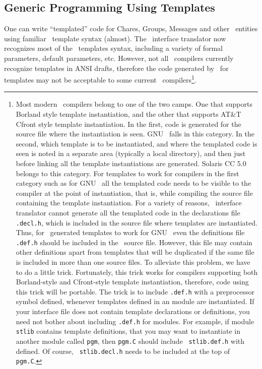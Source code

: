 \subsection{Generic Programming Using Templates}

One can write ``templated'' code for Chares, Groups, Messages and other
\charmpp\  entities using familiar \CC\ template syntax (almost). The \charmpp\
interface translator now recognizes most of the \CC\ templates syntax,
including a variety of formal parameters, default parameters, etc. However, not
all \CC\ compilers currently recognize templates in ANSI drafts, therefore the
code generated by \charmpp\ for templates may not be acceptable to some current
\CC\ compilers\footnote{ Most modern \CC\ compilers belong to one of the two
camps. One that supports Borland style template instantiation, and the other
that supports AT\&T Cfront style template instantiation. In the first, code is
generated for the source file where the instantiation is seen.  GNU \CC\ falls
in this category.  In the second, which template is to be instantiated, and
where the templated code is seen is noted in a separate area (typically a local
directory), and then just before linking all the template instantiations are
generated. Solaris CC 5.0 belongs to this category. For templates to work for
compilers in the first category such as for GNU \CC\ all the templated code
needs to be visible to the compiler at the point of instantiation, that is,
while compiling the source file containing the template instantiation. For a
variety of reasons, \charmpp\ interface translator cannot generate all the
templated code in the declarations file {\tt *.decl.h}, which is included in
the source file where templates are instantiated. Thus, for \charmpp\ generated
templates to work for GNU \CC\ even the definitions file {\tt *.def.h} should
be included in the \CC\ source file. However, this file may contain other
definitions apart from templates that will be duplicated if the same file is
included in more than one source files. To alleviate this problem, we have to
do a little trick. Fortunately, this trick works for compilers supporting both
Borland-style and Cfront-style template instantiation, therefore, code using
this trick will be portable. The trick is to include {\tt *.def.h} with a
preprocessor symbol \kw{CK\_TEMPLATES\_ONLY} defined, whenever templates
defined in an \kw{extern} module are instantiated. If your interface file does
not contain template declarations or definitions, you need not bother about
including {\tt *.def.h} for \kw{extern} modules.  For example, if module {\tt
stlib} contains template definitions, that you may want to instantiate in
another module called {\tt pgm}, then {\tt pgm.C} should include {\tt
stlib.def.h} with \kw{CK\_TEMPLATES\_ONLY} defined. Of course, {\tt
stlib.decl.h} needs to be included at the top of {\tt pgm.C}.  }. 


